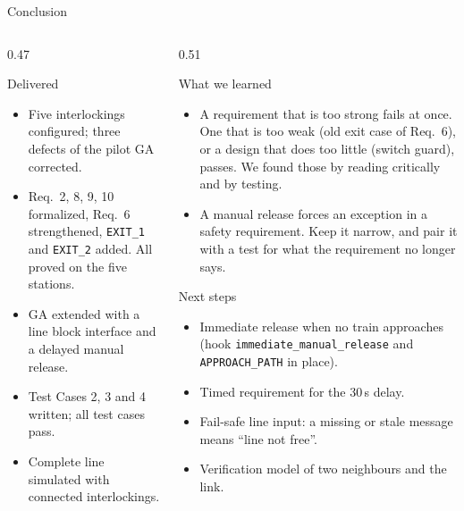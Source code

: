 \documentclass[aspectratio=169,10pt]{beamer}
\newcommand{\bodyfont}{\fontsize{7.8}{9.6}\selectfont}
\newcommand{\smallfont}{\fontsize{7}{8.6}\selectfont}
\begin{document}
\begin{frame}{Conclusion}{}
  \begin{columns}[T]
    \begin{column}{0.47\textwidth}
      \begin{safebox}{Delivered}
        \begin{itemize}\setlength{\itemsep}{2pt}\bodyfont
          \item Five interlockings configured; three defects of the pilot GA corrected.
          \item Req.~2, 8, 9, 10 formalized, Req.~6 strengthened, \texttt{EXIT\_1} and \texttt{EXIT\_2} added. All proved on the five stations.
          \item GA extended with a line block interface and a delayed manual release.
          \item Test Cases 2, 3 and 4 written; all test cases pass.
          \item Complete line simulated with connected interlockings.
        \end{itemize}
      \end{safebox}
    \end{column}

    \begin{column}{0.51\textwidth}
      \begin{proverbox}{What we learned}
        \begin{itemize}\smallfont
          \item A requirement that is too strong fails at once. One that is too weak (old exit case of Req.~6), or a design that does too little (switch guard), passes. We found those by reading critically and by testing.
          \item A manual release forces an exception in a safety requirement. Keep it narrow, and pair it with a test for what the requirement no longer says.
        \end{itemize}
      \end{proverbox}
      \vspace{-1mm}
      \begin{proverbox}{Next steps}
        \begin{itemize}\smallfont
          \item Immediate release when no train approaches (hook \texttt{immediate\_manual\_release} and \texttt{APPROACH\_PATH} in place).
          \item Timed requirement for the 30\,s delay.
          \item Fail-safe line input: a missing or stale message means ``line not free''.
          \item Verification model of two neighbours and the link.
        \end{itemize}
      \end{proverbox}
    \end{column}
  \end{columns}
\end{frame}
\end{document}
